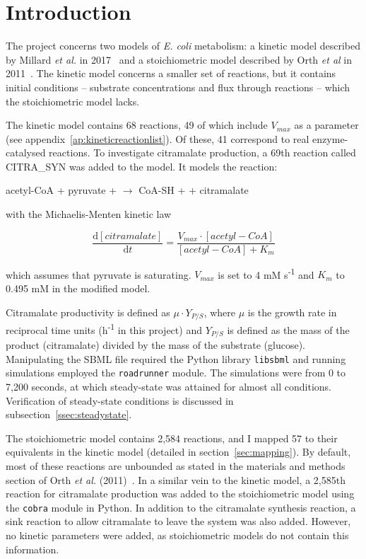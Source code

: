 \documentclass[parskip=full, numbers=noenddot]{scrreprt}
\begin{document}
\chapter*{Introduction}
\label{ch:intro}

The project concerns two models of \emph{E. coli} metabolism: a kinetic model described by Millard \emph{et al.} in 2017~\cite{millard_metabolic_2017} and a stoichiometric model described by Orth \emph{et al} in 2011~\cite{orth_comprehensive_2011}. The kinetic model concerns a smaller set of reactions, but it contains initial conditions -- substrate concentrations and flux through reactions -- which the stoichiometric model lacks.

The kinetic model contains 68 reactions, 49 of which include $V_{max}$ as a parameter (see appendix~\ref{ap:kineticreactionlist}). Of these, 41 correspond to real enzyme-catalysed reactions. To investigate citramalate production, a 69th reaction called CITRA\_SYN was added to the model. It models the reaction:

\begin{center}
  acetyl-CoA + pyruvate +  $\rightarrow$ CoA-SH +  + citramalate
\end{center}

with the Michaelis-Menten kinetic law

\[
  \frac{\mathrm{d}[citramalate]}{\mathrm{d}t} = 
  \frac{V_{max} \cdot [acetyl-CoA]}{[acetyl-CoA] + K_{m}}
\]

which assumes that pyruvate is saturating. $V_{max}$ is set to 4 mM s\textsuperscript{-1} and $K_{m}$ to 0.495 mM in the modified model.

Citramalate productivity is defined as $\mu \cdot Y_{P/S}$, where $\mu$ is the growth rate in reciprocal time units (h\textsuperscript{-1} in this project) and $Y_{P/S}$ is defined as the mass of the product (citramalate) divided by the mass of the substrate (glucose). Manipulating the SBML file required the Python library \texttt{libsbml} and running simulations employed the \texttt{roadrunner} module. The simulations were from 0 to 7,200 seconds, at which steady-state was attained for almost all conditions. Verification of steady-state conditions is discussed in subsection~\ref{ssec:steadystate}.

The stoichiometric model contains 2,584 reactions, and I mapped 57 to their equivalents in the kinetic model (detailed in section~\ref{sec:mapping}). By default, most of these reactions are unbounded as stated in the materials and methods section of Orth \emph{et al.} (2011)~\cite{orth_comprehensive_2011}. In a similar vein to the kinetic model, a 2,585th reaction for citramalate production was added to the stoichiometric model using the \texttt{cobra} module in Python. In addition to the citramalate synthesis reaction, a sink reaction to allow citramalate to leave the system was also added. However, no kinetic parameters were added, as stoichiometric models do not contain this information.
\end{document}
